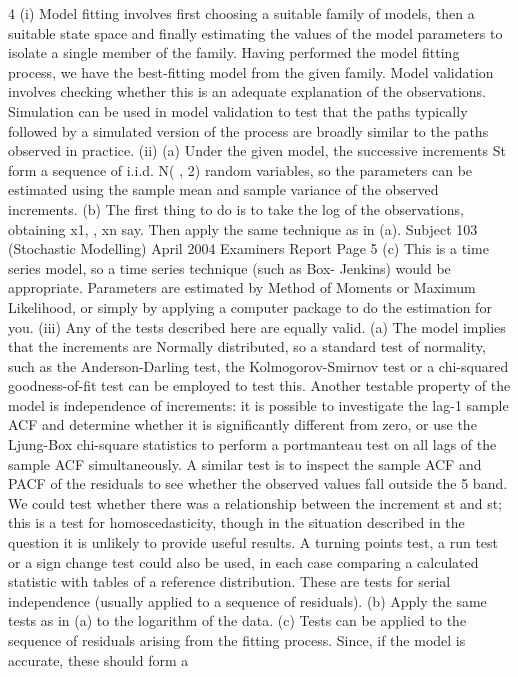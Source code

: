 \documentclass[a4paper,12pt]{article}
\begin{document}
\begin{enumerate}
4 (i) Model fitting involves first choosing a suitable family of models, then a
suitable state space and finally estimating the values of the model parameters
to isolate a single member of the family.
Having performed the model fitting process, we have the best-fitting model
from the given family. Model validation involves checking whether this is an
adequate explanation of the observations.
Simulation can be used in model validation to test that the paths typically
followed by a simulated version of the process are broadly similar to the paths
observed in practice.
(ii) (a) Under the given model, the successive increments St form a
sequence of i.i.d. N( , 2) random variables, so the parameters can be
estimated using the sample mean and sample variance of the observed
increments.
(b) The first thing to do is to take the log of the observations, obtaining x1,
, xn say. Then apply the same technique as in (a).
Subject 103 (Stochastic Modelling) April 2004 Examiners Report
Page 5
(c) This is a time series model, so a time series technique (such as Box-
Jenkins) would be appropriate.
Parameters are estimated by Method of Moments or Maximum
Likelihood, or simply by applying a computer package to do the
estimation for you.
(iii) Any of the tests described here are equally valid.
(a) The model implies that the increments are Normally distributed, so a
standard test of normality, such as the Anderson-Darling test, the
Kolmogorov-Smirnov test or a chi-squared goodness-of-fit test can be
employed to test this.
Another testable property of the model is independence of increments:
it is possible to investigate the lag-1 sample ACF and determine
whether it is significantly different from zero, or use the Ljung-Box
chi-square statistics to perform a portmanteau test on all lags of the
sample ACF simultaneously.
A similar test is to inspect the sample ACF and PACF of the residuals
to see whether the observed values fall outside the 5%
band.
We could test whether there was a relationship between the increment
st and st; this is a test for homoscedasticity, though in the situation
described in the question it is unlikely to provide useful results.
A turning points test, a run test or a sign change test could also be
used, in each case comparing a calculated statistic with tables of a
reference distribution. These are tests for serial independence (usually
applied to a sequence of residuals).
(b) Apply the same tests as in (a) to the logarithm of the data.
(c) Tests can be applied to the sequence of residuals arising from the
fitting process. Since, if the model is accurate, these should form a

\end{enumerate}
\end{document}
